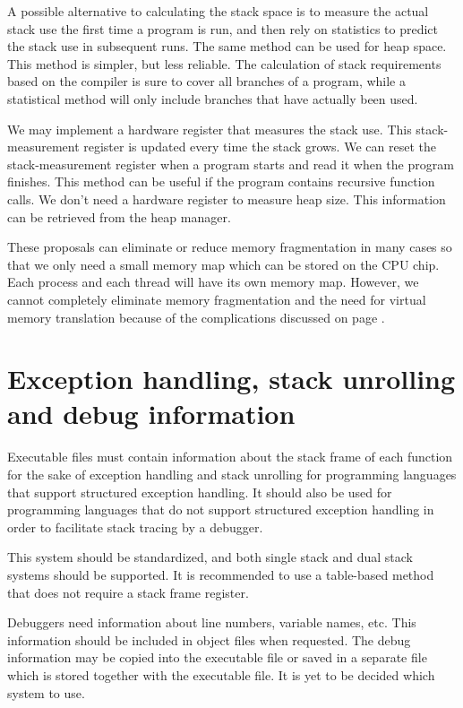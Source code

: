 \documentclass[forwardcom.tex]{subfiles}
\begin{document}
A possible alternative to calculating the stack space is to measure the actual stack use the first time a program is run, and then rely on statistics to predict the stack use in subsequent runs. The same method can be used for heap space. This method is simpler, but less reliable. The calculation of stack requirements based on the compiler is sure to cover all branches of a program, while a statistical method will only include branches that have actually been used. 
\vspace{2mm}

We may implement a hardware register that measures the stack use. This stack-measurement register is updated every time the stack grows. We can reset the stack-measurement register when a program starts and read it when the program finishes. This method can be useful if the program contains recursive function calls. We don't need a hardware register to measure heap size. This information can be retrieved from the heap manager. 
\vspace{2mm}

These proposals can eliminate or reduce memory fragmentation in many cases so that we only need a small memory map which can be stored on the CPU chip. Each process and each thread will have its own memory map. However, we cannot completely eliminate memory fragmentation and the need for virtual memory translation because of the complications discussed on page \pageref{memoryManagement}.

\section{Exception handling, stack unrolling and debug information} \label{exceptionHandling}
Executable files must contain information about the stack frame of each function for the sake of exception handling and stack unrolling for programming languages that support structured exception handling. 
It should also be used for programming languages that do not support structured exception handling in order to facilitate stack tracing by a debugger. 
\vspace{2mm}

This system should be standardized, and both single stack and dual stack systems should be supported. 
It is recommended to use a table-based method that does not require a stack frame register. 
\vspace{2mm}

Debuggers need information about line numbers, variable names, etc. This information should be included in object files when requested. The debug information may be copied into the executable file or saved in a separate file which is stored together with the executable file. It is yet to be decided which system to use. 
\end{document}

